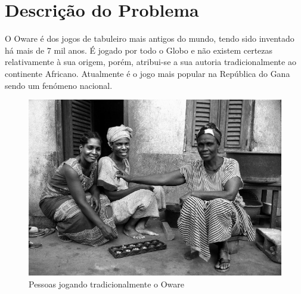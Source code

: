 \documentclass[15pt,a4paper]{article}
\begin{document}
\section{Descrição do Problema}
O Oware é dos jogos de tabuleiro mais antigos do mundo, tendo sido inventado há mais de 7 mil anos. É jogado por todo o Globo e não existem certezas relativamente à sua origem, porém, atribui-se a sua autoria tradicionalmente ao continente Africano. Atualmente é o jogo mais popular na República do Gana sendo um fenómeno nacional.

\begin{figure}[h!]
\begin{center}
\includegraphics[scale=20]{awale.jpg}
\caption{Pessoas jogando tradicionalmente o Oware}
\label{fig:traditional}
\end{center}
\end{figure}
\end{document}

